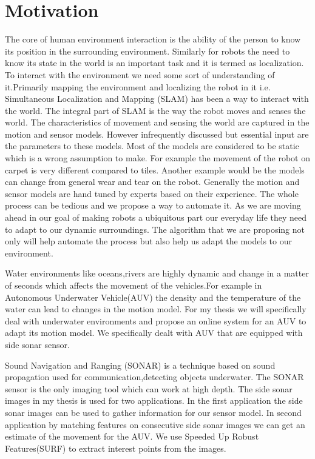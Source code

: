 \documentclass[12pt]{dalcsthesis}
\begin{document}
\section{Motivation}
The core of human environment interaction is the ability of the person to know its position in the surrounding environment. Similarly for robots the need to know its state in the world is an important task and it is termed as localization. To interact with the environment we need some sort of understanding of it.Primarily mapping the environment and localizing the robot in it i.e. Simultaneous Localization and Mapping (SLAM) has been a way to interact with the world. The integral part of SLAM is the way the robot moves and senses the world. The characteristics of movement and sensing the world are captured in the motion and sensor models. However infrequently discussed but essential input are the parameters to these models. Most of the models are considered to be static which is a wrong assumption to make. For example the movement of the robot on carpet is very different compared to tiles. Another example would be the models can change from general wear and tear on the robot. Generally the motion and sensor models are hand tuned by experts based on their experience. The whole process can be tedious and we propose a way to automate it. As we are moving ahead in our goal of making robots a ubiquitous part our everyday life they need to adapt to our dynamic surroundings. The algorithm that we are proposing not only will help automate the process but also help us adapt the models to our environment.

Water environments like oceans,rivers are highly dynamic and change in a matter of seconds which affects the movement of the vehicles.For example in Autonomous Underwater Vehicle(AUV) the density and the temperature of the water can lead to changes in the motion model. For my thesis we will specifically deal with underwater environments and propose an online system for an AUV to adapt its motion model. We specifically dealt with AUV that are equipped with side sonar sensor. 

Sound Navigation and Ranging (SONAR) is a technique based on sound propagation used for communication,detecting objects underwater. The SONAR sensor is the only imaging tool which can work at high depth. The side sonar images in my thesis is used for two applications. In the first application the side sonar images can be used to gather information for our sensor model. In second application by matching features on consecutive side sonar images we can get an estimate of the movement for the AUV. We use Speeded Up Robust Features(SURF) to extract interest points from the images. 
\end{document}
